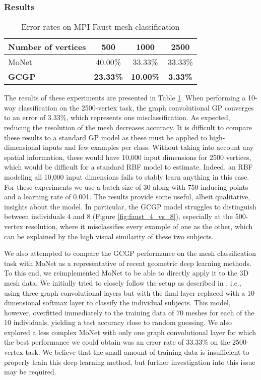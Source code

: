 \documentclass{article}
\begin{document}
\subsubsection{Results}



\begin{table}[tb]
	\centering
	\caption{Error rates on MPI Faust mesh classification}
	\label{tab:MPIFAUST}
	\begin{tabular}{lccc}
		\toprule
		Number of vertices & 500 &  1000 & 2500\\
		\midrule
		MoNet & 40.00\% & 33.33\% & 33.33\% \\ 
		\textbf{GCGP} & \textbf{23.33\%} & \textbf{10.00\%} & \textbf{3.33\%}\\
	\end{tabular}
	\vspace{-.6cm}
\end{table}

The results of these experiments are presented in Table \ref{tab:MPIFAUST}. When performing a 10-way classification on the 2500-vertex task, the graph convolutional GP converges to an error of 3.33\%, which represents one misclassification. As expected, reducing the resolution of the mesh decreases accuracy. It is difficult to compare these results to a standard GP model as these must be applied to high-dimensional inputs and few examples per class. Without taking into account any spatial information, these would have 10,000 input dimensions for 2500 vertices, which would be difficult for a standard RBF model to estimate. Indeed, an RBF modeling all 10,000 input dimensions fails to stably learn anything in this case. For these experiments we use a batch size of 30 along with 750 inducing points and a learning rate of 0.001. The results provide some useful, albeit qualitative, insights about the model. In particular, the GCGP model struggles to distinguish between individuals 4 and 8 (Figure \ref{fig:faust_4_vs_8}), especially at the 500-vertex resolution, where it misclassifies every example of one as the other, which can be explained by the high visual similarity of these two subjects.

We also attempted to compare the GCGP performance on the mesh classification task with MoNet as a representative of recent geometric deep learning methods. To this end, we reimplemented MoNet to be able to directly apply it to the 3D mesh data. We initially tried to closely follow the setup as described in \citep{moNet}, i.e., using three graph convolutional layers but with the final layer replaced with a 10 dimensional softmax layer to classify the individual subjects. This model, however, overfitted immediately to the training data of 70 meshes for each of the 10 individuals, yielding a test accuracy close to random guessing. We also explored a less complex MoNet with only one graph convolutional layer for which the best performance we could obtain was an error rate of 33.33\% on the 2500-vertex task. We believe that the small amount of training data is insufficient to properly train this deep learning method, but further investigation into this issue may be required.
\end{document}
